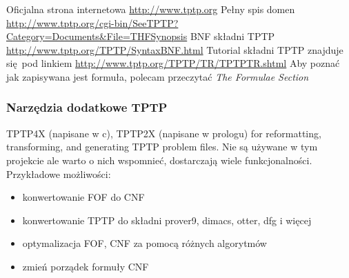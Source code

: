 \documentclass[a4paper,12pt]{article}
\begin{document}


\noindent
Oficjalna strona internetowa \url{http://www.tptp.org}
\newline
Pełny spis domen \url{http://www.tptp.org/cgi-bin/SeeTPTP?Category=Documents&File=THFSynopsis}
\newline
BNF składni TPTP \url{http://www.tptp.org/TPTP/SyntaxBNF.html}
\newline
Tutorial składni TPTP znajduje się pod linkiem \url{http://www.tptp.org/TPTP/TR/TPTPTR.shtml} Aby poznać jak zapisywana jest formuła, polecam przeczytać \textit{The Formulae Section}

\subsubsection{Narzędzia dodatkowe TPTP}

TPTP4X (napisane w c), TPTP2X (napisane w prologu) for reformatting, transforming, and generating TPTP problem files. Nie są używane w tym projekcie ale warto o nich wspomnieć, dostarczają wiele funkcjonalności.
Przykładowe możliwości:

\begin{itemize}
  \item konwertowanie \gls{FOF} do \gls{CNF}
  \item konwertowanie TPTP do składni prover9, dimacs, otter, dfg i więcej
  \item optymalizacja \gls{FOF}, \gls{CNF} za pomocą różnych algorytmów
  \item zmień porządek formuły \gls{CNF}
\end{itemize}
\end{document}
